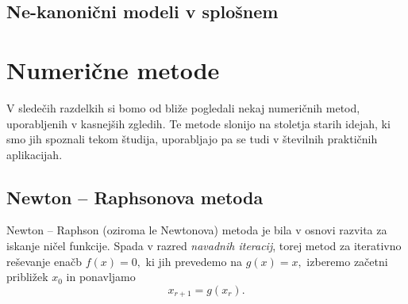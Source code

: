 \documentclass[12pt,a4paper]{amsart}
\theoremstyle{definition} %
\theoremstyle{plain} %
\begin{document}
\subsection{Ne-kanonični modeli v splošnem}

\section{Numerične metode}
V sledečih razdelkih si bomo od bliže pogledali nekaj numeričnih metod, uporabljenih v kasnejših zgledih. Te metode slonijo na stoletja starih
idejah, ki smo jih spoznali tekom študija, uporabljajo pa se tudi v številnih praktičnih aplikacijah.
\subsection{Newton -- Raphsonova metoda} \label{nr}
Newton -- Raphson (oziroma le Newtonova) metoda je bila v osnovi razvita za iskanje ničel funkcije. Spada v razred \textit{navadnih iteracij}, torej metod za iterativno
reševanje enačb $f(x) = 0,$ ki jih prevedemo na $g(x) = x,$ izberemo začetni približek $x_{0}$ in ponavljamo 
\[
    x_{r+1} = g(x_{r}).
\]
\end{document}

